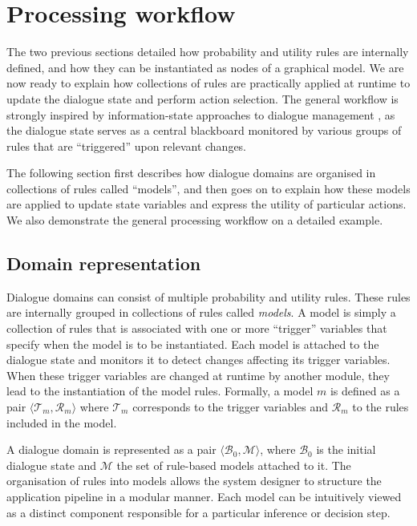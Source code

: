
%

\section{Processing workflow}
\label{sec:processing-workflow}

The two previous sections detailed how probability and utility rules are internally defined, and how they can be instantiated as nodes of a graphical model. We are now ready to explain how collections of rules are practically applied at runtime to update the dialogue state and perform action selection. The general workflow is strongly inspired by information-state approaches to dialogue management \citep{Larsason:2000}, as the dialogue state serves as a central blackboard monitored by various groups of rules that are ``triggered'' upon relevant changes. 

The following section first describes how dialogue domains are organised in collections of rules called ``models'', and then goes on to explain how these models are applied to update state variables and express the utility of particular actions. We also demonstrate the general processing workflow on a detailed example. 


\subsection{Domain representation}

Dialogue domains can consist of multiple probability and utility rules. These rules are internally grouped in collections of rules called \textit{models}. A model is simply a collection of rules that is associated with one or more ``trigger'' variables that specify when the model is to be instantiated. Each model is attached to the dialogue state and monitors it to detect changes affecting its trigger variables. When these trigger variables are changed at runtime by another module, they lead to the instantiation of the model rules. Formally, a model $m$ is defined as a pair $\langle \mathcal{T}_m, \mathcal{R}_m \rangle$ where $\mathcal{T}_m$ corresponds to the trigger variables and $\mathcal{R}_m$ to the rules included in the model.

A dialogue domain is represented as a pair $\langle \mathcal{B}_0, \mathcal{M} \rangle$, where $\mathcal{B}_0$ is the initial dialogue state  and $\mathcal{M}$ the set of rule-based models attached to it. The organisation of rules into models allows the system designer to structure the application pipeline in a modular manner. Each model can be intuitively viewed as a distinct component responsible for a particular inference or decision step. 

